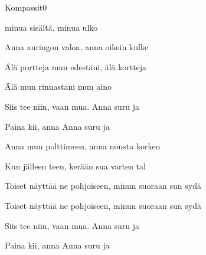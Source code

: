 \documentclass[12pt,a4paper]{article}
\begin{document}
\thispagestyle{empty}
\begin{mysong}{Kompassit}{0}

\begin{SBVerse}
   minua sisältä,  minua ulko

  Anna  auringon valoa, anna  oikein kulke

  Älä  portteja mun edestäni, älä  kortteja

  Älä  mun rinnastani mun  aino
\end{SBVerse}

\begin{SBChorus}
  Siis  tee niin, vaan  mua.  Anna 
  suru ja 

  Paina  kii, anna  Anna 
  suru ja 
\end{SBChorus}

\begin{SBVerse}
  Anna  mun polttimeen, anna  nousta
  korkeu

  Kun  jälleen teen,  kerään sua varten
  tal

  Toiset  näyttää ne pohjoiseen, minun 
  suoraan sun sydä

  Toiset  näyttää ne pohjoiseen, minun 
  suoraan sun sydä
\end{SBVerse}

\begin{SBChorus}
  Siis  tee niin, vaan  mua.  Anna 
  suru ja 

  Paina  kii, anna  Anna 
  suru ja 
\end{SBChorus}

\end{mysong}
\end{document}
